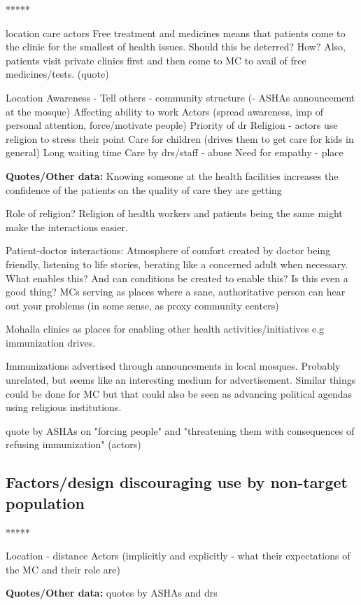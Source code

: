 *****

location
care
actors
Free treatment and medicines means that patients come to the clinic for the smallest of health issues. Should this be deterred? How? Also, patients visit private clinics first and then come to MC to avail of free medicines/tests. (quote)

Location
Awareness - Tell others - community structure (- ASHAs announcement at the mosque)
Affecting ability to work
Actors (spread awareness, imp of personal attention, force/motivate people)
Priority of dr
Religion - actors use religion to stress their point
Care for children (drives them to get care for kids in general)
Long waiting time
Care by drs/staff - abuse 
Need for empathy - place

\textbf{Quotes/Other data:}
Knowing someone at the health facilities increases the confidence of the patients on the quality of care they are getting

Role of religion? Religion of health workers and patients being the same might make the interactions easier.

Patient-doctor interactions: Atmosphere of comfort created by doctor being friendly, listening to life stories, berating like a concerned adult when necessary. What enables this? And can conditions be created to enable this? Is this even a good thing? MCs serving as places where a sane, authoritative person can hear out your problems (in some sense, as proxy community centers)

Mohalla clinics as places for enabling other health activities/initiatives e.g immunization drives.

Immunizations advertised through announcements in local mosques. Probably unrelated, but seems like an interesting medium for advertisement. Similar things could be done for MC but that could also be seen as advancing political agendas using religious institutions.

quote by ASHAs on "forcing people" and "threatening them with consequences of refusing immunization" (actors)

\subsection{Factors/design discouraging use by non-target population}

*****

Location - distance
Actors (implicitly and explicitly - what their expectations of the MC and their role are)

\textbf{Quotes/Other data:}
quotes by ASHAs and drs